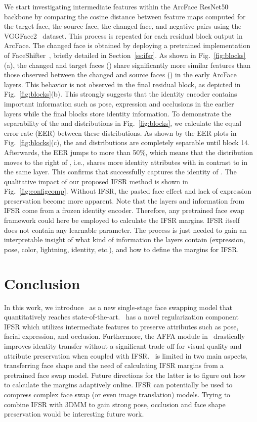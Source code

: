 \documentclass[10pt,twocolumn,letterpaper]{article}
\newcommand{\fti}[1]{\textit{FaceDancer}{#1}}
\begin{document}
We start investigating intermediate features within the ArcFace ResNet50 backbone by comparing the cosine distance between feature maps computed for the target face, the source face, the changed face, and negative pairs using the VGGFace2~\cite{vggface2} dataset. This process is repeated for each residual block output in ArcFace.
The changed face is obtained by deploying a pretrained implementation of FaceShifter~\cite{faceshifter}, briefly detailed in Section~\ref{ss:ifsr}.
As shown in Fig.~\ref{fig:blocks}(a), the changed and target faces () share significantly more similar features than those observed between the changed and source faces () in the early ArcFace layers. 
This behavior is not observed in the final residual block, as depicted in Fig.~\ref{fig:blocks}(b). 
This strongly suggests that the identity encoder contains important information such as pose, expression and occlusions in the earlier layers while the final blocks store identity information.
To demonstrate the separability of the  and  distributions in Fig.~\ref{fig:blocks}, we calculate the equal error rate (EER) between these distributions. 
As shown by the EER plots in Fig.~\ref{fig:blocks}(c), the  and  distributions are completely separable until block 14. 
Afterwards, the EER jumps to more than 50\%, which means that the  distribution moves to the right of , i.e.,  shares more identity attributes with  in contrast to  in the same layer. This confirms that  successfully captures the identity of .
The qualitative impact of our proposed IFSR method is shown in Fig.~\ref{fig:configcomp}. Without IFSR, the pasted face effect and lack of expression preservation become more apparent.
Note that the layers and information from IFSR come from a frozen identity encoder. Therefore, any pretrained face swap framework could here be employed to calculate the IFSR margins.  IFSR itself does not contain any learnable parameter. The process is  just needed to gain an interpretable insight of what kind of information the layers contain (expression, pose, color, lightning, identity, etc.), and how to define the margins for IFSR.




\section{Conclusion}
In this work, we introduce \fti~as a new single-stage  face swapping model that quantitatively reaches state-of-the-art. 
\fti~has a novel  regularization component IFSR which utilizes intermediate features to preserve attributes such as pose, facial expression, and occlusion. 
Furthermore, the AFFA module in \fti~drastically improves identity transfer without a significant trade off for visual quality and attribute preservation when coupled with IFSR. \fti~is limited in two main aspects, transferring face shape and the need of calculating IFSR margins from a pretrained face swap model. Future directions for the latter is to figure out how to calculate the margins adaptively online. IFSR can potentially be used to compress complex face swap (or even image translation) models. Trying to combine IFSR with 3DMM to gain strong pose, occlusion and face shape preservation would be interesting future work.
\end{document}
